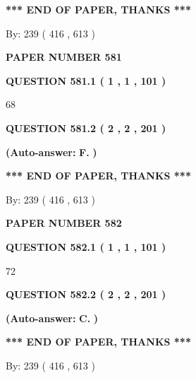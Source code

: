 \documentclass{ctexart}
\begin{document}
 
   
   
   
   
\vspace{1.0in} 
{\textbf{\large{ *** END OF PAPER, THANKS *** }}} 
   
   
\hspace{1.0in} By: 
 239 ( 416 ,  613 )
   
   
   
   
\newpage 
\setcounter{page}{ 
   581001 } 
   
   
 {\textbf{ \Large{ PAPER NUMBER  581  }}}
   
   
   
   
  
  
{\textbf{\large{QUESTION
581.1 
 ( 1 , 1 , 101 )
}}}

68
  
  
{\textbf{\large{QUESTION
581.2 
 ( 2 , 2 , 201 )
}}}
 
 
{\textbf{(Auto-answer:}}
{\textbf{\large{
F.}}}
{\textbf{)}}
 
 
   
   
   
   
\vspace{1.0in} 
{\textbf{\large{ *** END OF PAPER, THANKS *** }}} 
   
   
\hspace{1.0in} By: 
 239 ( 416 ,  613 )
   
   
   
   
\newpage 
\setcounter{page}{ 
   582001 } 
   
   
 {\textbf{ \Large{ PAPER NUMBER  582  }}}
   
   
   
   
  
  
{\textbf{\large{QUESTION
582.1 
 ( 1 , 1 , 101 )
}}}

72
  
  
{\textbf{\large{QUESTION
582.2 
 ( 2 , 2 , 201 )
}}}
 
 
{\textbf{(Auto-answer:}}
{\textbf{\large{
C.}}}
{\textbf{)}}
 
 
   
   
   
   
\vspace{1.0in} 
{\textbf{\large{ *** END OF PAPER, THANKS *** }}} 
   
   
\hspace{1.0in} By: 
 239 ( 416 ,  613 )
   
   
   
   
\newpage 
\setcounter{page}{ 
   583001 } 
   
\end{document}
